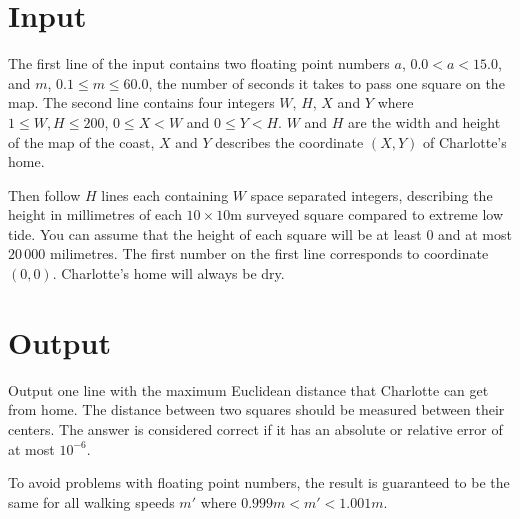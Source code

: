 \section*{Input}
The first line of the input contains two floating point numbers $a$, $0.0 < a < 15.0$, and $m$,
$0.1 \leq m \leq 60.0$, the number of seconds it takes to pass one square on the map.
The second line contains four integers $W$, $H$, $X$ and $Y$ where $1 \le W,H \le 200$, $0 \le X < W$
and $0 \le Y < H$. $W$ and $H$ are the width and height of the map of the coast, $X$ and $Y$ describes
the coordinate $(X, Y)$ of Charlotte's home.

Then follow $H$ lines each containing $W$ space separated integers, describing the height in
millimetres of each $10\times 10$m surveyed square compared to extreme low tide. You can assume that
the height of each square will be at least $0$ and at most $20\,000$ milimetres.
The first number on the first line corresponds to coordinate $(0, 0)$.
Charlotte's home will always be dry.

\section*{Output}
Output one line with the maximum Euclidean distance that Charlotte can get from home.
The distance between two squares should be measured between their centers.
The answer is considered correct if it has an absolute or relative error of at most $10^{-6}$.

To avoid problems with floating point numbers, the result is guaranteed to be the same for all
walking speeds $m'$ where $0.999 m < m' < 1.001 m$.

